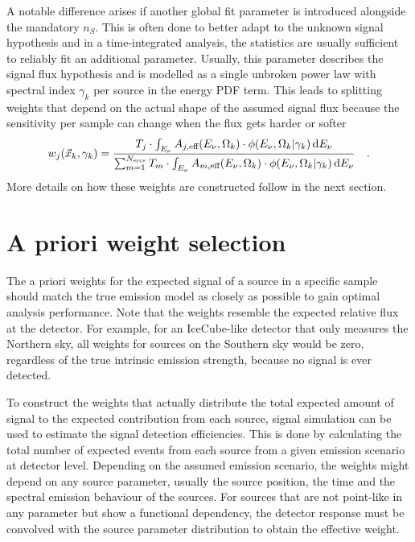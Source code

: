 A notable difference arises if another global fit parameter is introduced alongside the mandatory $n_S$.
This is often done to better adapt to the unknown signal hypothesis and in a time-integrated analysis, the statistics are usually sufficient to reliably fit an additional parameter.
Usually, this parameter describes the signal flux hypothesis and is modelled as a single unbroken power law with spectral index $\gamma_k$ per source in the energy PDF term.
This leads to splitting weights that depend on the actual shape of the assumed signal flux because the sensitivity per sample can change when the flux gets harder or softer
\begin{equation}
  w_j(\vec{x}_k, \gamma_k)
  = \frac
      {
        T_j \cdot \int_{E_\nu} A_{j,\text{eff}}(E_\nu,\Omega_k)\cdot
        \phi(E_\nu, \Omega_k | \gamma_k)\,\mathrm{d}E_\nu
      }
      {
        \sum_{m=1}^{N_\text{srcs}}
        T_m \cdot \int_{E_\nu} A_{m,\text{eff}}(E_\nu,\Omega_k)\cdot
        \phi(E_\nu, \Omega_k | \gamma_k)\,\mathrm{d}E_\nu
      }
  \quad\text{.}
\end{equation}
More details on how these weights are constructed follow in the next section.


\section{A priori weight selection}
The a priori weights for the expected signal of a source in a specific sample should match the true emission model as closely as possible to gain optimal analysis performance.
Note that the weights resemble the expected relative flux at the detector.
For example, for an IceCube-like detector that only measures the Northern sky, all weights for sources on the Southern sky would be zero, regardless of the true intrinsic emission strength, because no signal is ever detected.

To construct the weights that actually distribute the total expected amount of signal to the expected contribution from each source, signal simulation can be used to estimate the signal detection efficiencies.
This is done by calculating the total number of expected events from each source from a given emission scenario at detector level.
Depending on the assumed emission scenario, the weights might depend on any source parameter, usually the source position, the time and the spectral emission behaviour of the sources.
For sources that are not point-like in any parameter but show a functional dependency, the detector response must be convolved with the source parameter distribution to obtain the effective weight.

